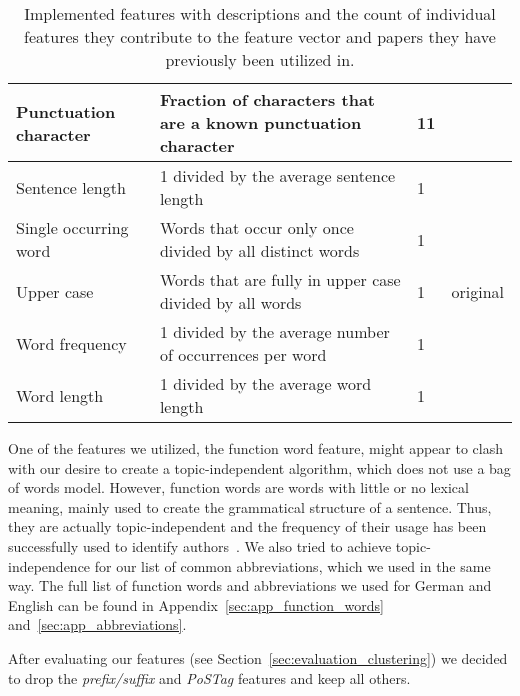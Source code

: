 \begin{savenotes}
\begin{table}[ht!]
\begin{center}
\begin{tabular}{p{2.6cm}|p{6cm}|p{1.2cm}|p{1.2cm}}
    Punctuation character   & Fraction of characters that are a known punctuation character             & 11                & \cite{madigan2005author} \cite{narayanan2012feasibility}\\ \hline
    Sentence length          & 1 divided by the average sentence length                                  & 1                 & \cite{de2001mining}\\ \hline
    Single occurring word    & Words that occur only once divided by all distinct words                  & 1                 & \cite{madigan2005author} \cite{narayanan2012feasibility}\\ \hline
    Upper case           & Words that are fully in upper case divided by all words                   & 1                 & original\\ \hline
    Word frequency           & 1 divided by the average number of occurrences per word                   & 1                 & \cite{madigan2005author} \cite{narayanan2012feasibility}\\ \hline
    Word length              & 1 divided by the average word length                                      & 1                 & \cite{argamon2003style} \cite{narayanan2012feasibility}\\
    \end{tabular}
    \end{center}
    \caption{Implemented features with descriptions and the count of individual features they contribute to the feature vector and papers they have previously been utilized in.}
    \label{tab:featureTable}
\end{table}


One of the features we utilized, the function word feature, might appear to clash with our desire to create a topic-independent algorithm, which does not use a bag of words model.
However, function words are words with little or no lexical meaning, mainly used to create the grammatical structure of a sentence.
Thus, they are actually topic-independent and the frequency of their usage has been successfully used to identify authors~\cite{mosteller1962applied}.
We also tried to achieve topic-independence for our list of common abbreviations, which we used in the same way.
The full list of function words and abbreviations we used for German and English can be found in Appendix~\ref{sec:app_function_words} and~\ref{sec:app_abbreviations}.

\end{savenotes}

After evaluating our features (see Section~\ref{sec:evaluation_clustering}) we decided to drop the \textit{prefix/suffix} and \textit{PoSTag} features and keep all others.



